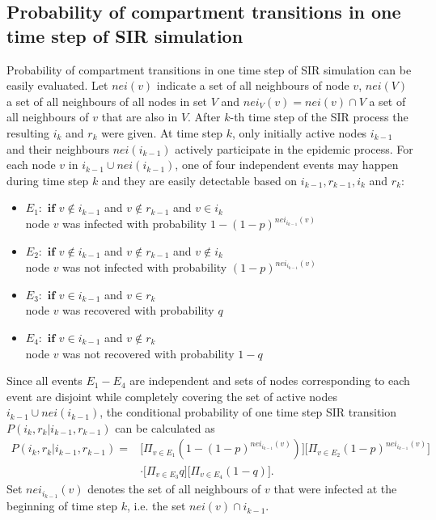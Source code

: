 \documentclass[times, utf8, diplomski]{fer}
\newcommand\tab[1][1cm]{\hspace*{#1}}
\begin{document}
\subsection{Probability of compartment transitions in one time step of SIR simulation}
Probability of compartment transitions in one time step of SIR simulation can be easily evaluated. Let $nei(v)$ indicate a set of all neighbours of node $v$,  $nei(V)$ a set of all neighbours of all nodes in set $V$ and  $nei_V(v) = nei(v) \cap V$  a set of all neighbours of $v$ that are also in $V$. After $k$-th time step of the SIR process the resulting $i_k$ and $r_k$ were given. At time step $k$, only initially active nodes $i_{k - 1}$ and their neighbours $nei(i_{k - 1})$ actively participate in the epidemic process. For each node $v$ in $i_{k - 1} \cup nei(i_{k - 1})$, one of four independent events may happen during time step $k$ and they are easily detectable based on $i_{k - 1}, r_{k - 1}, i_{k}$ and $r_{k}$:
\let\labelitemi\labelitemii
\begin{itemize}
\label{listE}
\item{$E_1:$ $\mathbf{if}$ $v \not\in i_{k - 1}$ and $v \not\in r_{k - 1}$ and $v \in i_{k}$\\ \tab node $v$ was infected with probability $1 - (1 - p) ^ {nei_{i_{k-1}}(v)}$}
\item{$E_2:$ $\mathbf{if}$ $v \not\in i_{k - 1}$ and $v \not\in r_{k - 1}$ and $v \not \in i_{k}$\\ \tab node $v$ was not infected with probability $(1 - p)^{nei_{i_{k-1}}(v)}$}
\item{$E_3:$ $\mathbf{if}$ $v \in i_{k - 1}$ and $v \in r_{k}$\\ \tab  node $v$ was recovered with probability $q$}
\item{$E_4:$ $\mathbf{if}$ $v \in i_{k - 1}$ and $v \not\in r_{k}$ \\ \tab node $v$ was not recovered with probability $1 - q$}
\end{itemize}

Since all events $E_1 - E_4$ are independent and  sets of nodes corresponding to each event are disjoint while completely covering the set of active nodes $i_{k - 1} \cup nei(i_{k - 1})$, the  conditional probability of  one time step SIR transition $P(i_k, r_k | i_{k - 1}, r_{k - 1})$ can be calculated as
\begin{equation}
\begin{split}
P(i_k, r_k | i_{k - 1}, r_{k - 1}) =  &\big[\Pi_{v \in E_1} (1 - (1 - p) ^ {nei_{i_{k-1}}(v)})\big]\big[\Pi_{v \in E_2} (1 - p)^{nei_{i_{k-1}}(v)} \big] \\& \cdot
\big[\Pi_{v \in E_3} q\big]\big[ \Pi_{v \in E_4} (1 - q)\big].
\end{split}
\label{fISS}
\end{equation}
Set  $nei_{i_{k-1}}(v)$ denotes the set of all neighbours of $v$ that were  infected  at the beginning of time step $k$, i.e. the set $nei(v) \cap i_{k - 1}$. 
\end{document}
